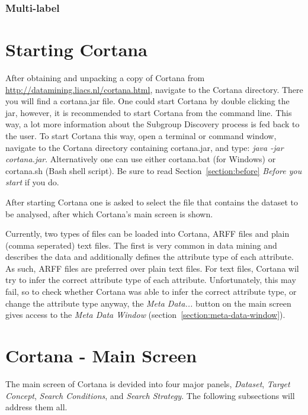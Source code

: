 \documentclass{article}
\begin{document}
\subsubsection{Multi-label}


\section{Starting Cortana}
After obtaining and unpacking a copy of Cortana from \url{http://datamining.liacs.nl/cortana.html}, navigate to the Cortana directory.
There you will find a cortana.jar file.
One could start Cortana by double clicking the jar, however, it is recommended to start Cortana from the command line.
This way, a lot more information about the Subgroup Discovery process is fed back to the user.
To start Cortana this way, open a terminal or command window, navigate to the Cortana directory containing cortana.jar, and type: \emph{java -jar cortana.jar}.
Alternatively one can use either cortana.bat (for Windows) or cortana.sh (Bash shell script).
Be sure to read Section~\ref{section:before} \emph{Before you start} if you do.

After starting Cortana one is asked to select the file that contains the dataset to be analysed, after which Cortana's main screen is shown.

Currently, two types of files can be loaded into Cortana, ARFF files and plain (comma seperated) text files.
The first is very common in data mining and describes the data and additionally defines the attribute type of each attribute.
As such, ARFF files are preferred over plain text files.
For text files, Cortana wil try to infer the correct attribute type of each attribute.
Unfortunately, this may fail, so to check whether Cortana was able to infer the correct attribute type, or change the attribute type anyway, the \emph{Meta Data...} button on the main screen gives access to the \emph{Meta Data Window} (section~\ref{section:meta-data-window}).





\section{Cortana - Main Screen}
\label{section:main}
The main screen of Cortana is devided into four major panels, \emph{Dataset}, \emph{Target Concept}, \emph{Search Conditions}, and \emph{Search Strategy}.
The following subsections will address them all.
\end{document}
